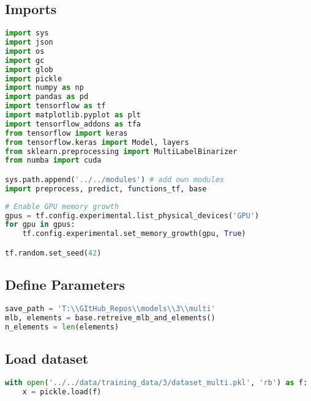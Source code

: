 \hypertarget{imports}{%
\subsection{Imports}\label{imports}}

\begin{lstlisting}[language=Python]
import sys
import json
import os
import gc
import glob
import pickle
import numpy as np
import pandas as pd
import tensorflow as tf
import matplotlib.pyplot as plt
import tensorflow_addons as tfa
from tensorflow import keras
from tensorflow.keras import Model, layers
from sklearn.preprocessing import MultiLabelBinarizer
from numba import cuda

sys.path.append('../../modules') # add own modules
import preprocess, predict, functions_tf, base
\end{lstlisting}

\begin{lstlisting}[language=Python]
# Enable GPU memory growth
gpus = tf.config.experimental.list_physical_devices('GPU')
for gpu in gpus:
    tf.config.experimental.set_memory_growth(gpu, True)

tf.random.set_seed(42)
\end{lstlisting}

\hypertarget{define-parameters}{%
\subsection{Define Parameters}\label{define-parameters}}

\begin{lstlisting}[language=Python]
save_path = 'T:\\GItHub_Repos\\models\\3\\multi'
mlb, elements = base.retreive_mlb_and_elements()
n_elements = len(elements)
\end{lstlisting}

\hypertarget{load-dataset}{%
\subsection{Load dataset}\label{load-dataset}}

\begin{lstlisting}[language=Python]
with open('../../data/training_data/3/dataset_multi.pkl', 'rb') as f:
    x = pickle.load(f)
\end{lstlisting}

